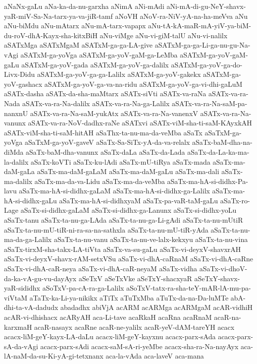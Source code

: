 {aNaNx-gaLu
aNa-ka-da-nu-garxha
aNimA
aNi-mAdi
aNi-mA-di-gu-NeY-shavx-yaR-miV-Sa-Na-tarx-ya-va-jiR-tamf
aNoVH
aNoV-ra-NiV-yA-na-ha-meVva
aNu
aNu-biMdu
aNu-mAtarx
aNu-mA-tarx-vapapx
aNu-tA-kA-maR-mA-yiV-ya-biM-du-roV-dhA-Kayx-sha-kitxBiH
aNu-viMge
aNu-vi-giM-talU
aNu-vi-nalilx
aSATxMga
aSATxMgaM
aSATxM-ga-ga-LA-give
aSATxM-ga-ga-Li-ga-nu-gu-Na-vAgi
aSATxM-ga-yoVga
aSATxM-ga-yoV-gaM-ga-LeMba
aSATxM-ga-yoV-gaM-gaLu
aSATxM-ga-yoV-gada
aSATxM-ga-yoV-ga-dalilx
aSATxM-ga-yoV-ga-do-Livx-Didu
aSATxM-ga-yoV-ga-ga-Lalilx
aSATxM-ga-yoV-gakekx
aSATxM-ga-yoV-gashacx
aSATxM-ga-yoV-ga-va-na-ridu
aSATxM-ga-yoV-ga-vi-dhi-gaLuM
aSATx-dasha
aSATx-da-sha-maMtarx
aSATx-siVti
aSATx-va-raNa
aSATx-va-ra-Nada
aSATx-va-ra-Na-dalilx
aSATx-va-ra-Na-ga-Lalilx
aSATx-va-ra-Na-saM-pa-nanxnU
aSATx-va-ra-Na-saM-yukAtx
aSATx-va-ra-Na-vanenxV
aSATx-va-ra-Na-vanunx
aSATx-va-ra-NoV-dadhx-raNe
aSATxvi
aSATx-viM-sha-ti-saM-KAyxkAH
aSATx-viM-sha-ti-saM-hitAH
aSaThx-ta-nu-ma-da-veMba
aSaTx
aSaTxM-ga-yoVga
aSaTxM-ga-yoV-gaveV
aSaTx-Sa-SiTx-yA-da-va-relalx
aSaTx-baM-dha-na-diMda
aSaTx-baM-dha-vanunx
aSaTx-daLa
aSaTx-da-Lada
aSaTx-da-La-ka-ma-la-dalilx
aSaTx-koVTi
aSaTx-ku-lAdi
aSaTx-mU-tiRya
aSaTx-mada
aSaTx-ma-daM-gaLa
aSaTx-ma-daM-gaLaM
aSaTx-ma-daM-gaLu
aSaTx-ma-dali
aSaTx-ma-dalilx
aSaTx-ma-da-va-Lidu
aSaTx-ma-da-veMba
aSaTx-ma-hA-si-didhx-Pa-lavu
aSaTx-ma-hA-si-didhx-gaLaM
aSaTx-ma-hA-si-didhx-ga-Lalilx
aSaTx-ma-hA-si-didhx-gaLu
aSaTx-ma-hA-si-didhxyaM
aSaTx-pa-vaR-taM-gaLu
aSaTx-ro-Lage
aSaTx-si-didhx-gaLaM
aSaTx-si-didhx-ga-Lanunx
aSaTx-si-didhx-yoLu
aSaTx-tanu
aSaTx-ta-nu-ga-LAda
aSaTx-ta-nu-ga-Li-gAdi
aSaTx-ta-nu-mUtiR
aSaTx-ta-nu-mU-tiR-ni-ra-sa-na-sathxla
aSaTx-ta-nu-mU-tiR-yAda
aSaTx-ta-nu-ma-da-ga-Lalilx
aSaTx-ta-nu-vanu
aSaTx-ta-nu-ve-lalx-kekxyu
aSaTx-ta-nu-vina
aSaTx-tirxM-sha-takx-LA-tiVta
aSaTx-va-su-gaLu
aSaTx-vi-deyxV-shavxrAH
aSaTx-vi-deyxV-shavx-rAM-setxVSu
aSaTx-vi-dhA-caRnaM
aSaTx-vi-dhA-caRne
aSaTx-vi-dhA-caR-neya
aSaTx-vi-dhA-caR-neyaM
aSaTx-vidha
aSaTx-vi-dhoV-da-ka-vA-gu-vu-dayAyx
aSeTxV
aSeTxVke
aSeTxY-shacxyaR
aSeTxY-shavx-yaR-sididhx
aSoTxV-pa-cA-ra-ga-Lalilx
aSoTxV-tatx-ra-sha-teY-mAR-lA-mu-pa-viVtaM
aTaTx-ka-Li-ya-nikikx
aTiTx
aTuTxMba
aTuTx-da-na-Da-luMTe
abA-dhi-ta-vA-dadudx
abadadhx
abiVjA
acARM
acARMga
acARMgaM
acAR-vidhiH
acAR-vi-dhishacx
acARyAH
aca-Li-tave
acaRkaH
acaRna
acaRnaM
acaR-na-karxmaH
acaR-nasayx
acaRne
acaR-ne-yalilx
acaR-yeV-dAM-tareYH
acacx
acacx-liM-geY-kayx-LA-daLu
acacx-liM-geY-kayxnu
acacx-parx-sAda
acacx-parx-sA-da-vAgi
acacx-parx-sAdi
acacx-saM-sA-ri-yeMbe
acacx-sha-ra-Na-nayAyx
aca-lA-naM-da-su-Ki-yA-gi-tetxnanx
aca-la-vAda
aca-laveV
aca-mana
}
